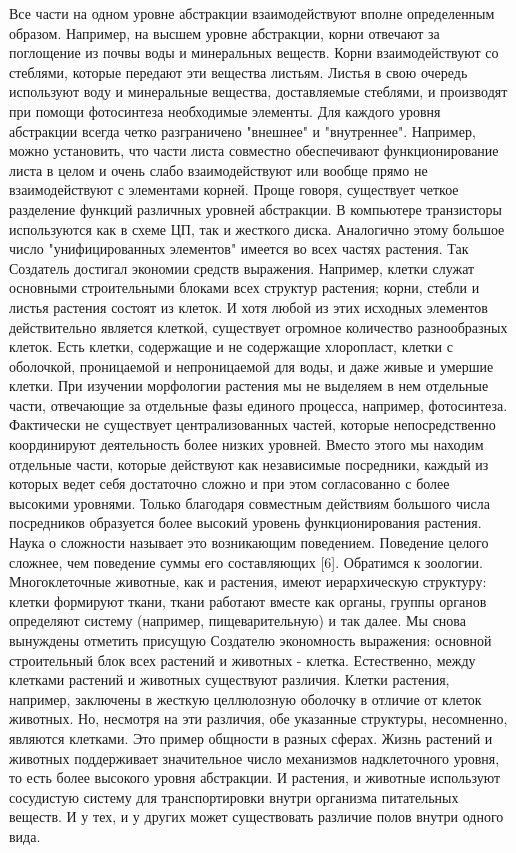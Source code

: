 \documentclass[11pt]{article}
\begin{document}
Все части на одном уровне абстракции взаимодействуют вполне определенным образом. Например, на высшем уровне абстракции, корни отвечают за поглощение из почвы воды и минеральных веществ. Корни взаимодействуют со стеблями, которые передают эти вещества листьям. Листья в свою очередь используют воду и минеральные вещества, доставляемые стеблями, и производят при помощи фотосинтеза необходимые элементы. 
Для каждого уровня абстракции всегда четко разграничено "внешнее" и "внутреннее". Например, можно установить, что части листа совместно обеспечивают функционирование листа в целом и очень слабо взаимодействуют или вообще прямо не взаимодействуют с элементами корней. Проще говоря, существует четкое разделение функций различных уровней абстракции. 
В компьютере транзисторы используются как в схеме ЦП, так и жесткого диска. Аналогично этому большое число "унифицированных элементов" имеется во всех частях растения. Так Создатель достигал экономии средств выражения. Например, клетки служат основными строительными блоками всех структур растения; корни, стебли и листья растения состоят из клеток. И хотя любой из этих исходных элементов действительно является клеткой, существует огромное количество разнообразных клеток. Есть клетки, содержащие и не содержащие хлоропласт, клетки с оболочкой, проницаемой и непроницаемой для воды, и даже живые и умершие клетки. 
При изучении морфологии растения мы не выделяем в нем отдельные части, отвечающие за отдельные фазы единого процесса, например, фотосинтеза. Фактически не существует централизованных частей, которые непосредственно координируют деятельность более низких уровней. Вместо этого мы находим отдельные части, которые действуют как независимые посредники, каждый из которых ведет себя достаточно сложно и при этом согласованно с более высокими уровнями. Только благодаря совместным действиям большого числа посредников образуется более высокий уровень функционирования растения. Наука о сложности называет это возникающим поведением. Поведение целого сложнее, чем поведение суммы его составляющих [6]. 
Обратимся к зоологии. Многоклеточные животные, как и растения, имеют иерархическую структуру: клетки формируют ткани, ткани работают вместе как органы, группы органов определяют систему (например, пищеварительную) и так далее. Мы снова вынуждены отметить присущую Создателю экономность выражения: основной строительный блок всех растений и животных - клетка. Естественно, между клетками растений и животных существуют различия. Клетки растения, например, заключены в жесткую целлюлозную оболочку в отличие от клеток животных. Но, несмотря на эти различия, обе указанные структуры, несомненно, являются клетками. Это пример общности в разных сферах. 
Жизнь растений и животных поддерживает значительное число механизмов надклеточного уровня, то есть более высокого уровня абстракции. И растения, и животные используют сосудистую систему для транспортировки внутри организма питательных веществ. И у тех, и у других может существовать различие полов внутри одного вида. 
\end{document}
